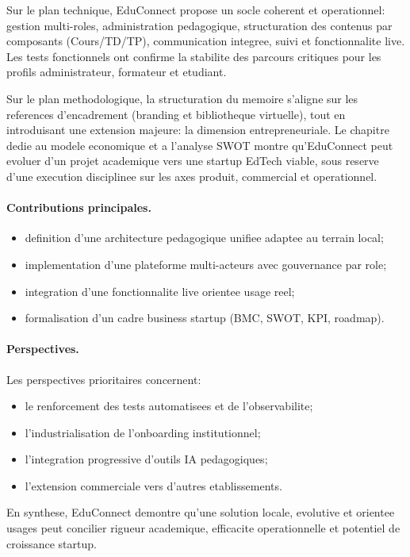 ﻿\documentclass[12pt,a4paper,oneside]{report}
\begin{document}
Sur le plan technique, EduConnect propose un socle coherent et operationnel: gestion multi-roles, administration pedagogique, structuration des contenus par composants (Cours/TD/TP), communication integree, suivi et fonctionnalite live. Les tests fonctionnels ont confirme la stabilite des parcours critiques pour les profils administrateur, formateur et etudiant.

Sur le plan methodologique, la structuration du memoire s'aligne sur les references d'encadrement (branding et bibliotheque virtuelle), tout en introduisant une extension majeure: la dimension entrepreneuriale. Le chapitre dedie au modele economique et a l'analyse SWOT montre qu'EduConnect peut evoluer d'un projet academique vers une startup EdTech viable, sous reserve d'une execution disciplinee sur les axes produit, commercial et operationnel.

\paragraph{Contributions principales.}
\begin{itemize}
  \item definition d'une architecture pedagogique unifiee adaptee au terrain local;
  \item implementation d'une plateforme multi-acteurs avec gouvernance par role;
  \item integration d'une fonctionnalite live orientee usage reel;
  \item formalisation d'un cadre business startup (BMC, SWOT, KPI, roadmap).
\end{itemize}

\paragraph{Perspectives.}
Les perspectives prioritaires concernent:
\begin{itemize}
  \item le renforcement des tests automatisees et de l'observabilite;
  \item l'industrialisation de l'onboarding institutionnel;
  \item l'integration progressive d'outils IA pedagogiques;
  \item l'extension commerciale vers d'autres etablissements.
\end{itemize}

En synthese, EduConnect demontre qu'une solution locale, evolutive et orientee usages peut concilier rigueur academique, efficacite operationnelle et potentiel de croissance startup.


\clearpage
\printbibliography[title={Bibliographie}, heading=bibintoc]
\end{document}
